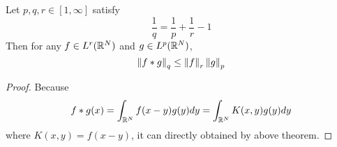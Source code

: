 \begin{cor}\label{cor:young}
	Let $p,q,r \in [1,\infty]$ satisfy
	\begin{equation*}
		\frac{1}{q}=\frac{1}{p}+\frac{1}{r}-1
	\end{equation*}
	Then for any $f \in L^r(\mathbb{R}^N)$ and $g \in L^p(\mathbb{R}^N)$,
	\begin{equation*}
		\left\lVert f * g\right\lVert_q \leq \left\lVert f\right\lVert_r\left\lVert g\right\lVert_p
	\end{equation*}
\end{cor}
\begin{proof}
	Because
	\begin{equation*}
		f * g (x) = \int_{\mathbb{R}^N} f(x-y)g(y)dy = \int_{\mathbb{R}^N}K(x,y)g(y)dy
	\end{equation*}
	where $K(x,y) = f(x-y)$, it can directly obtained by above theorem.
\end{proof}

